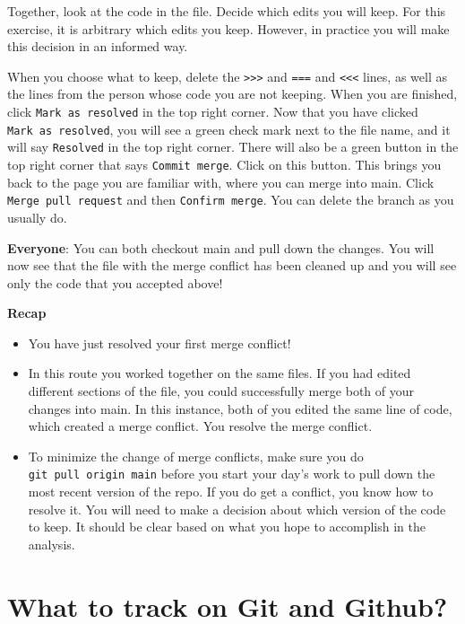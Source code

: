 \documentclass[
]{book}
\providecommand{\tightlist}{%
  \setlength{\itemsep}{0pt}\setlength{\parskip}{0pt}}
\begin{document}
Together, look at the code in the file. Decide which edits you will keep. For
this exercise, it is arbitrary which edits you keep. However, in practice you
will make this decision in an informed way.

When you choose what to keep, delete the \texttt{\textgreater{}\textgreater{}\textgreater{}} and \texttt{===} and \texttt{\textless{}\textless{}\textless{}} lines, as
well as the lines from the person whose code you are not keeping. When you are
finished, click \texttt{Mark\ as\ resolved} in the top right corner. Now that you have
clicked \texttt{Mark\ as\ resolved}, you will see a green check mark next to the file
name, and it will say \texttt{Resolved} in the top right corner. There will also be a
green button in the top right corner that says \texttt{Commit\ merge}. Click on this
button. This brings you back to the page you are familiar with, where you can
merge into main. Click \texttt{Merge\ pull\ request} and then \texttt{Confirm\ merge}. You can
delete the branch as you usually do.

\textbf{Everyone}:
You can both checkout main and pull down the changes. You will now see that the file with the merge conflict has been cleaned up and you will see only the code that you accepted above!

\textbf{Recap}

\begin{itemize}
\tightlist
\item
  You have just resolved your first merge conflict!
\item
  In this route you worked together on the same files. If you had edited different
  sections of the file, you could successfully merge both of your changes into main.
  In this instance, both of you edited the same line of code, which created a
  merge conflict. You resolve the merge conflict.
\item
  To minimize the change of merge conflicts, make sure you do \texttt{git\ pull\ origin\ main} before you
  start your day's work to pull down the most recent version of the repo. If you do
  get a conflict, you know how to resolve it. You will need to make a decision about
  which version of the code to keep. It should be clear based on what you hope to
  accomplish in the analysis.
\end{itemize}

\chapter{What to track on Git and Github?}\label{what-to-track-on-git-and-github}
\end{document}
